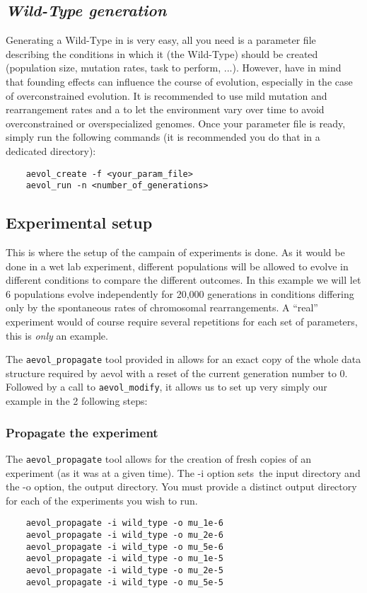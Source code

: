 \subsection{\emph{Wild-Type generation}}
Generating a Wild-Type in \aevol{} is very easy, all you need is a parameter file describing the conditions in which it (the Wild-Type) should be created (population size, mutation rates, task to perform, ...).
However, have in mind that founding effects can influence the course of evolution, especially in the case of overconstrained evolution. It is recommended to use mild mutation and rearrangement rates and a to let the environment vary over time to avoid overconstrained or overspecialized genomes.
Once your parameter file is ready, simply run the following commands (it is recommended you do that in a dedicated directory):

\begin{verbatim}
	aevol_create -f <your_param_file>
	aevol_run -n <number_of_generations>
\end{verbatim}



\subsection{Experimental setup}
This is where the setup of the campain of experiments is done.
As it would be done in a wet lab experiment, different populations will be allowed to evolve in different conditions to compare the different outcomes. In this example we will let 6 populations evolve independently for 20,000 generations in conditions differing only by the spontaneous rates of chromosomal rearrangements. A ``real'' experiment would of course require several repetitions for each set of parameters, this is \emph{only} an example.

The \verb?aevol_propagate? tool provided in \aevol{} allows for an exact copy of the whole data structure required by aevol with a reset of the current generation number to 0. Followed by a call to \verb?aevol_modify?, it allows us to set up very simply our example in the 2 following steps:


\subsubsection{Propagate the experiment}
The \verb?aevol_propagate? tool allows for the creation of fresh copies of an experiment (as it was at a given time). The -i option sets the input directory and the -o option, the output directory. You must provide a distinct output directory for each of the experiments you wish to run.
\begin{verbatim}
	aevol_propagate -i wild_type -o mu_1e-6
	aevol_propagate -i wild_type -o mu_2e-6
	aevol_propagate -i wild_type -o mu_5e-6
	aevol_propagate -i wild_type -o mu_1e-5
	aevol_propagate -i wild_type -o mu_2e-5
	aevol_propagate -i wild_type -o mu_5e-5
\end{verbatim}

